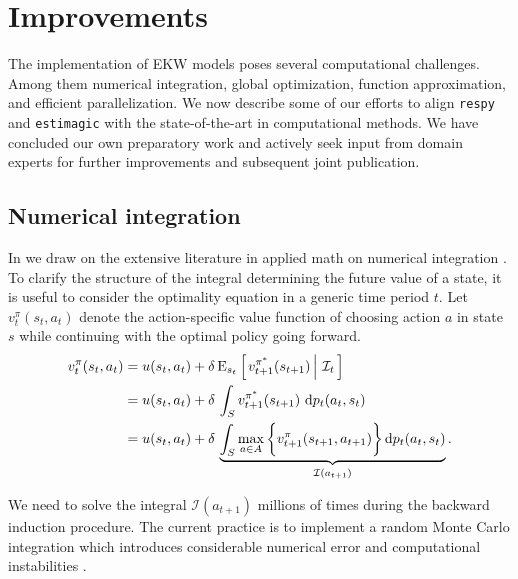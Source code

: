 \section{Improvements}\label{Computation}
The implementation of EKW models poses several computational challenges. Among them numerical integration, global optimization, function approximation, and efficient parallelization. We now describe some of our efforts to align \verb+respy+ and \verb+estimagic+ with the state-of-the-art in computational methods. We have concluded our own preparatory work and actively seek input from domain experts for further improvements and subsequent joint publication.
\subsection{Numerical integration}
In \citet{Gabler.2020a} we draw on the extensive literature in applied math on numerical integration \citep{Davis.2007,Gerstner.1998}.\\

\noindent To clarify the structure of the integral determining the future value of a state, it is useful to consider the optimality equation in a generic time period $t$. Let $v^{\pi}_{t}(s_t, a_t)$ denote the action-specific value function of choosing action $a$ in state $s$ while continuing with the optimal policy going forward.
%
\begin{align*}
v^{\pi}_{t}(s_t, a_t) & = u(s_t, a_t) + \delta\,\mathrm{E}_{s_t} \left[\left.v^{\pi^*}_{t + 1}(s_{t + 1})\,\right\vert\,\mathcal{I}_t\,\right] \\
& =  u(s_t, a_t) + \delta\, \int_S v^{\pi^*}_{t + 1}(s_{t + 1})\, \mathop{}\!\mathrm{d} p_t(a_t, s_t)\\
& =  u(s_t, a_t) + \delta\, \underbrace{\int_S \max_{a \in A}\bigg\{v^\pi_{t + 1}(s_{t + 1}, a_{t + 1})\bigg\}\mathop{}\!\mathrm{d} p_t(a_t, s_t)}_{\mathcal{I}(a_{t + 1})}.
\end{align*}

\noindent We need to solve the integral $\mathcal{I}(a_{t + 1})$ millions of times during the backward induction procedure. The current practice is to implement a random Monte Carlo integration which introduces considerable numerical error and computational instabilities \citep{Judd.2011}.\\


